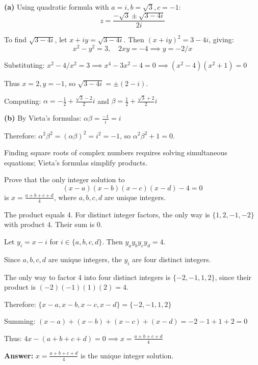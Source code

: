\begin{solution}
\textbf{(a)} Using quadratic formula with $a=i, b=\sqrt{3}, c=-1$:
$$
z = \frac{-\sqrt{3} \pm \sqrt{3-4i}}{2i}
$$

To find $\sqrt{3-4i}$, let $x+iy = \sqrt{3-4i}$. Then $(x+iy)^2 = 3-4i$, giving:
$$
x^2-y^2 = 3, \quad 2xy = -4 \implies y = -2/x
$$

Substituting: $x^2 - 4/x^2 = 3 \implies x^4 - 3x^2 - 4 = 0 \implies (x^2-4)(x^2+1)=0$

Thus $x=2, y=-1$, so $\sqrt{3-4i} = \pm(2-i)$.

Computing: $\alpha = -\frac{1}{2} + \frac{\sqrt{3}-2}{2}i$ and $\beta = \frac{1}{2} + \frac{\sqrt{3}+2}{2}i$

\textbf{(b)} By Vieta's formulas: $\alpha\beta = \frac{-1}{i} = i$

Therefore: $\alpha^2\beta^2 = (\alpha\beta)^2 = i^2 = -1$, so $\alpha^2\beta^2 + 1 = 0$.

\end{solution}

\begin{takeaways}
Finding square roots of complex numbers requires solving simultaneous equations; Vieta's formulas simplify products.
\end{takeaways}

\vspace{1cm}

\begin{problem}
Prove that the only integer solution to
$$ (x-a)(x-b)(x-c)(x-d) - 4 = 0 $$
is $x = \frac{a+b+c+d}{4}$, where $a, b, c, d$ are unique integers.
\end{problem}

\vspace{0.5cm}
\begin{hintbox}
The product equals 4. For distinct integer factors, the only way is $\{1, 2, -1, -2\}$ with product 4. Their sum is 0.
\end{hintbox}

\begin{solution}
Let $y_i = x-i$ for $i \in \{a,b,c,d\}$. Then $y_a y_b y_c y_d = 4$.

Since $a, b, c, d$ are unique integers, the $y_i$ are four distinct integers.

The only way to factor 4 into four distinct integers is $\{-2, -1, 1, 2\}$, since their product is $(-2)(-1)(1)(2) = 4$.

Therefore: $\{x-a, x-b, x-c, x-d\} = \{-2, -1, 1, 2\}$

Summing: $(x-a)+(x-b)+(x-c)+(x-d) = -2-1+1+2 = 0$

Thus: $4x - (a+b+c+d) = 0 \implies x = \frac{a+b+c+d}{4}$

\textbf{Answer:} $x = \frac{a+b+c+d}{4}$ is the unique integer solution.
\end{solution}

